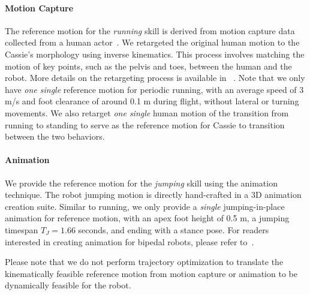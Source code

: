 


\paragraph{Motion Capture}
The reference motion for the \emph{running} skill is derived from motion capture data collected from a human actor~\citep{sfudatabase}. 
We retargeted the original human motion to the Cassie's morphology using inverse kinematics. 
This process involves matching the motion of key points, such as the pelvis and toes, between the human and the robot. 
More details on the retargeting process is available in ~\cite[Sec. II-B]{li2020animated}. 
Note that we only have \textit{one single} reference motion for periodic running, with an average speed of 3 m/s and foot clearance of around 0.1 m during flight, without lateral or turning movements.
We also retarget \textit{one single} human motion of the transition from running to standing to serve as the reference motion for Cassie to transition between the two behaviors.

\paragraph{Animation}
We provide the reference motion for the \textit{jumping} skill using the animation technique. 
The robot jumping motion is directly hand-crafted in a 3D animation creation suite. 
Similar to running, we only provide a \textit{single} jumping-in-place animation for reference motion, with an apex foot height of 0.5 m, a jumping timespan $T_J=1.66$ seconds, and ending with a stance pose. 
For readers interested in creating animation for bipedal robots, please refer to~\cite{li2020animated}.

Please note that we do not perform trajectory optimization to translate the kinematically feasible reference motion from motion capture or animation to be dynamically feasible for the robot.



